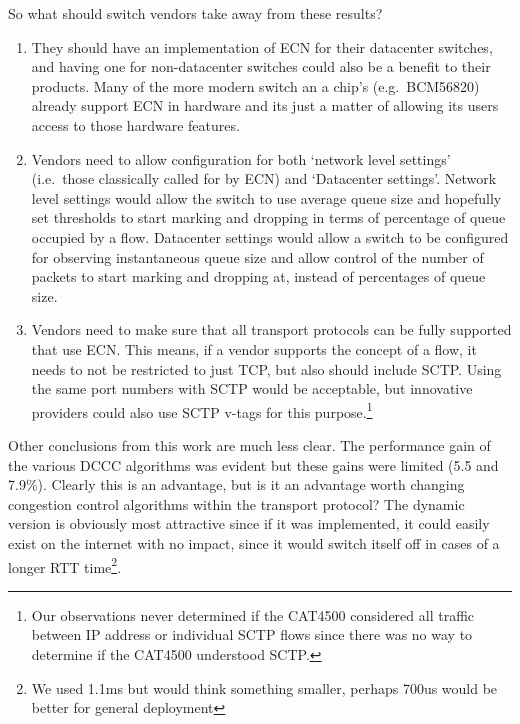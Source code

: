 \documentclass[12pt]{article}
\begin{document}
So what should switch vendors take away from these results?

\begin{enumerate}

\item They should have an implementation of ECN for their datacenter
  switches, and having one
for non-datacenter switches could also be a benefit to their products. Many of the more modern switch an a chip's (e.g.~BCM56820)
already support ECN in hardware and its just a matter of allowing its users access to those
hardware features.

\item Vendors need to allow configuration for both `network level settings' (i.e.~those classically called
for by ECN) and `Datacenter settings'. Network level settings would allow the switch to use average queue
size and hopefully set thresholds to start marking and dropping in terms of percentage of queue occupied by
a flow. Datacenter settings would allow a switch to be configured for observing instantaneous queue size
and allow control of the number of packets to start marking and
dropping at, instead of percentages of
queue size.

\item Vendors need to make sure that all transport protocols can be fully supported that use ECN. This
means, if a vendor supports the concept of a flow, it needs to not be restricted to just TCP, but also should include SCTP. Using the same port
numbers with SCTP would be acceptable, but innovative providers could also use SCTP v-tags for this purpose.\footnote{Our observations
never determined if the CAT4500 considered all traffic between IP address or individual SCTP flows since there was
no way to determine if the CAT4500 understood SCTP.}

\end{enumerate}

Other conclusions from this work are much less clear. The performance gain of the various DCCC algorithms
was evident but these gains were limited (5.5 and 7.9\%). Clearly this is an advantage, but is it an advantage
worth changing congestion control algorithms within the transport protocol? The dynamic version is obviously most
attractive since if it was implemented, it could easily exist on the
internet with no impact, since it would switch itself
off in cases of a longer RTT time\footnote{We used 1.1ms but would think something smaller, perhaps 700us would
be better for general deployment}. 
\end{document}
